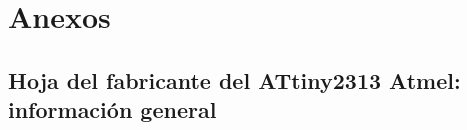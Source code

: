 \newpage
\section{Anexos}


\null\vspace{\fill}
\subsection{Hoja del fabricante del ATtiny2313 Atmel: información general} \label{an:01_GEN}
\vspace{\fill}
 
